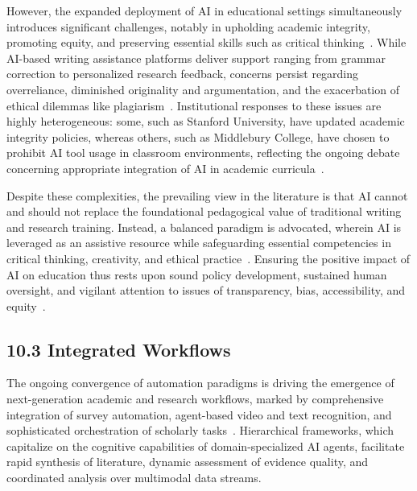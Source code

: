 \documentclass[11pt]{article}
\begin{document}
However, the expanded deployment of AI in educational settings simultaneously introduces significant challenges, notably in upholding academic integrity, promoting equity, and preserving essential skills such as critical thinking~\cite{ref109,ref110,ref112,ref113,ref114,ref115}. While AI-based writing assistance platforms deliver support ranging from grammar correction to personalized research feedback, concerns persist regarding overreliance, diminished originality and argumentation, and the exacerbation of ethical dilemmas like plagiarism~\cite{ref109,ref110,ref112,ref113,ref114,ref115}. Institutional responses to these issues are highly heterogeneous: some, such as Stanford University, have updated academic integrity policies, whereas others, such as Middlebury College, have chosen to prohibit AI tool usage in classroom environments, reflecting the ongoing debate concerning appropriate integration of AI in academic curricula~\cite{ref109,ref110,ref113,ref114,ref115}.

Despite these complexities, the prevailing view in the literature is that AI cannot and should not replace the foundational pedagogical value of traditional writing and research training. Instead, a balanced paradigm is advocated, wherein AI is leveraged as an assistive resource while safeguarding essential competencies in critical thinking, creativity, and ethical practice~\cite{ref109,ref110,ref113,ref114,ref115}. Ensuring the positive impact of AI on education thus rests upon sound policy development, sustained human oversight, and vigilant attention to issues of transparency, bias, accessibility, and equity~\cite{ref110,ref111,ref113,ref114,ref115}.

\subsection{10.3 Integrated Workflows}

The ongoing convergence of automation paradigms is driving the emergence of next-generation academic and research workflows, marked by comprehensive integration of survey automation, agent-based video and text recognition, and sophisticated orchestration of scholarly tasks~\cite{ref25,ref26,ref27,ref29,ref30,ref45,ref86,ref99,ref100,ref104,ref110,ref111,ref113}. Hierarchical frameworks, which capitalize on the cognitive capabilities of domain-specialized AI agents, facilitate rapid synthesis of literature, dynamic assessment of evidence quality, and coordinated analysis over multimodal data streams. 
\end{document}
